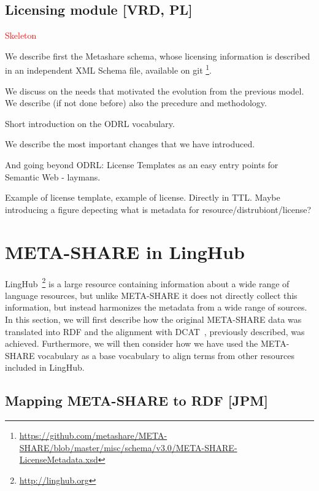 \documentclass{llncs}
\begin{document}
\subsection{Licensing module [VRD, PL]}
\label{sec:licensing}
\textcolor{red}{Skeleton}

We describe first the Metashare schema, whose licensing information is described in an independent XML Schema file, available on git \footnote{\url{https://github.com/metashare/META-SHARE/blob/master/misc/schema/v3.0/META-SHARE-LicenseMetadata.xsd}}. 


We discuss on the needs that motivated the evolution from the previous model. We describe (if not done before) also the precedure and methodology.

Short introduction on the ODRL vocabulary. 

We describe the most important changes that we have introduced.

And going beyond ODRL: License Templates as an easy entry points for Semantic Web - laymans.

Example of license template, example of license. Directly in TTL. Maybe introducing a figure depecting what is metadata for resource/distrubiont/license? 

\section{META-SHARE in LingHub}
\label{sec:linghub}

LingHub~\footnote{\url{http://linghub.org}} is a large resource containing information about a wide range of
language resources, but unlike META-SHARE it does not directly collect this
information, but instead harmonizes the metadata from a wide range of sources.
In this section, we will first describe how the original META-SHARE data was
translated into RDF and the alignment with DCAT~\cite{maali2014data}, previously
described, was achieved. Furthermore, we will then consider how we have used the
META-SHARE vocabulary as a base vocabulary to align terms from other resources
included in LingHub.

\subsection{Mapping META-SHARE to RDF [JPM]}
\label{sec:conversion}
\end{document}
